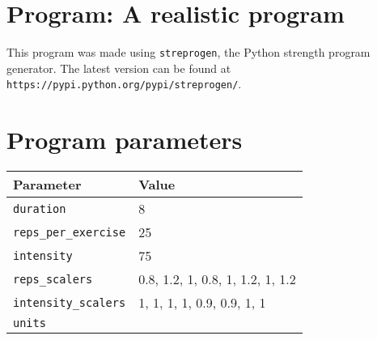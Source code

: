 \documentclass[12pt, a4paper]{article}%
\begin{document}
\large

\section*{Program: A realistic program}

This program was made using \verb|streprogen|,
the Python strength program generator.
The latest version can be found at \\
\verb|https://pypi.python.org/pypi/streprogen/|.


\section*{Program parameters}
\begin{tabular}{l|l}
	\textbf{Parameter} & \textbf{Value} \\ \hline
	\verb|duration|             & 8 \\
	\verb|reps_per_exercise|    & 25 \\
	\verb|intensity|        & 75 \\
	\verb|reps_scalers|         & 0.8, 1.2, 1, 0.8, 1, 1.2, 1, 1.2 \\
	\verb|intensity_scalers|    & 1, 1, 1, 1, 0.9, 0.9, 1, 1 \\
	\verb|units|                & 
\end{tabular}
\end{document}
